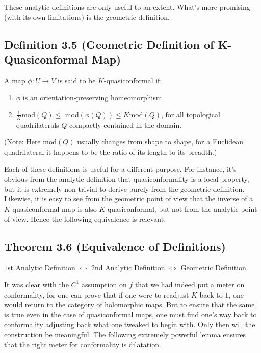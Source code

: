 \documentclass[11pt,a4paper]{article}
\begin{document}


        These analytic definitions are only useful to an extent. What's more promising (with its own limitations) is the geometric definition.

        \subsection*{Definition 3.5 (Geometric Definition of K-Quasiconformal Map)} A map $\phi: U \rightarrow V$ is said to be $K$-quasiconformal if:
       \begin{enumerate}
           \item $\phi$ is an orientation-preserving homeomorphism.
           \item $\frac{1}{K}$mod$(Q) \leq$ mod$(\phi(Q)) \leq K$mod$(Q)$, for all topological quadrilaterals $Q$ compactly contained in the domain.
       \end{enumerate}

       (Note: Here mod$(Q)$ usually changes from shape to shape, for a Euclidean quadrilateral it happens to be the ratio of its length to its breadth.)



        Each of these definitions is useful for a different purpose. For instance, it's obvious from the analytic definition that quasiconformality is a local property, but it is extremely non-trivial to derive purely from the geometric definition. Likewise, it is easy to see from the geometric point of view that the inverse of a $K$-quasiconformal map is also $K$-quasiconformal, but not from the analytic point of view. Hence the following equivalence is relevant.

        \subsection*{Theorem 3.6 (Equivalence of Definitions)} $1$st Analytic Definition $\iff$ $2$nd Analytic Definition $\iff$ Geometric Definition.



        It was clear with the $C^1$ assumption on $f$ that we had indeed put a meter on conformality, for one can prove that if one were to readjust $K$ back to $1$, one would return to the category of holomorphic maps. But to ensure that the same is true even in the case of quasiconformal maps, one must find one's way back to conformality adjusting back what one tweaked to begin with. Only then will the construction be meaningful. The following extremely powerful lemma ensures that the right meter for conformality is dilatation.
\end{document}
